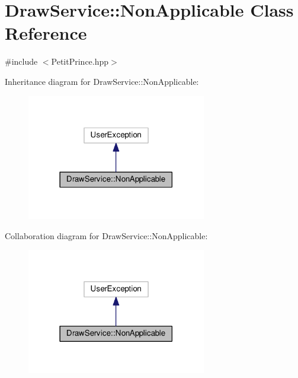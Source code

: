 \hypertarget{class_draw_service_1_1_non_applicable}{}\section{Draw\+Service\+:\+:Non\+Applicable Class Reference}
\label{class_draw_service_1_1_non_applicable}


{\ttfamily \#include $<$Petit\+Prince.\+hpp$>$}



Inheritance diagram for Draw\+Service\+:\+:Non\+Applicable\+:
\nopagebreak
\begin{figure}[H]
\begin{center}
\leavevmode
\includegraphics[width=222pt]{class_draw_service_1_1_non_applicable__inherit__graph}
\end{center}
\end{figure}


Collaboration diagram for Draw\+Service\+:\+:Non\+Applicable\+:
\nopagebreak
\begin{figure}[H]
\begin{center}
\leavevmode
\includegraphics[width=222pt]{class_draw_service_1_1_non_applicable__coll__graph}
\end{center}
\end{figure}
